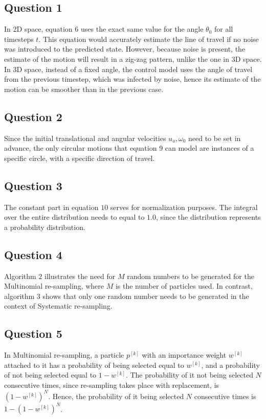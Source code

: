 \subsection{Question 1}

In 2D space, equation $6$ uses the exact same value for the angle $\theta_0$ for all timesteps $t$. This equation would accurately estimate
the line of travel if no noise was introduced to the predicted state. However, because noise is present, the estimate of the motion will result in a zig-zag pattern,
unlike the one in 3D space. In 3D space, instead of a fixed angle, the control model uses the angle of travel from the previous timestep, which was infected by
noise, hence its estimate of the motion can be smoother than in the previous case.

\subsection{Question 2}

Since the initial translational and angular velocities $u_o, \omega_0$ need to be set in advance, the only circular motions that equation $9$ can model 
are instances of a specific circle, with a specific direction of travel.

\subsection{Question 3}

The constant part in equation $10$ serves for normalization purposes. The integral over the entire distribution needs to equal to $1.0$, since the distribution
represents a probability distribution.

\subsection{Question 4}

Algorithm $2$ illustrates the need for $M$ random numbers to be generated for the Multinomial re-sampling, where $M$ is the number of particles used.
In contrast, algorithm $3$ shows that only one random number needs to be generated in the context of Systematic re-sampling.

\subsection{Question 5}

In Multinomial re-sampling, a particle $p^{[k]}$ with an importance weight $w^{[k]}$ attached to it has a probability of being selected equal to $w^{[k]}$, 
and a probability of not being selected equal to $1 - w^{[k]}$. The probability of it not being selected $N$ consecutive times, since re-sampling takes place with replacement, is $(1 - w^{[k]})^N$. Hence, the probability of it being selected $N$ consecutive times is $1 - (1 - w^{[k]})^N$.


